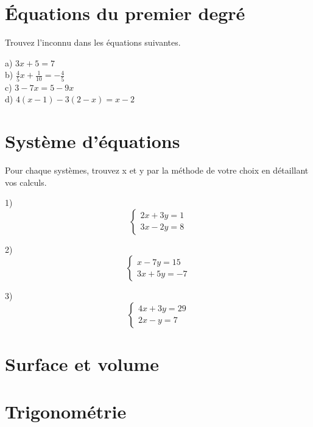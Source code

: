 \documentclass[12pt,a4paper]{article} %
\begin{document}
\section{Équations du premier degré}

\begin{exo} Trouvez l'inconnu dans les équations suivantes.\end{exo}  

a) $3x+5=7$ \\


b) $\frac{4}{5}x+\frac{1}{10}=-\frac{4}{5}$ \\


c) $3-7x=5-9x$ \\


d) $4(x-1)-3(2-x)=x-2$

\section{Système d'équations}
\begin{exo} Pour chaque systèmes, trouvez x et y par la méthode de votre choix en détaillant vos calculs.\end{exo} 
1)
$$
\left\{
    \begin{array}{ll}
        2x + 3y = 1 \\
        3x - 2y = 8
    \end{array}
\right.
$$

2)
$$
\left\{
    \begin{array}{ll}
        x - 7y = 15 \\
        3x + 5y = -7
    \end{array}
\right.
$$

3)
$$
\left\{
    \begin{array}{ll}
        4x + 3y = 29 \\
        2x - y = 7
    \end{array}
\right.
$$

\section{Surface et volume}



\section{Trigonométrie}
\end{document}
